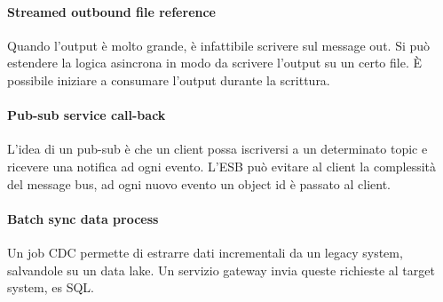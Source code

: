 \paragraph{Streamed outbound file reference}
Quando l'output è molto grande, è infattibile scrivere sul message out.
Si può estendere la logica asincrona in modo da scrivere l'output su un certo file.
È possibile iniziare a consumare l'output durante la scrittura.

\paragraph{Pub-sub service call-back}
L'idea di un pub-sub è che un client possa iscriversi a un determinato topic e ricevere
una notifica ad ogni evento.
L'ESB può evitare al client la complessità del message bus, ad ogni nuovo evento 
un object id è passato al client.

\paragraph{Batch sync data process}
Un job CDC permette di estrarre dati incrementali da un legacy system, salvandole su un data 
lake.
Un servizio gateway invia queste richieste al target system, es SQL.